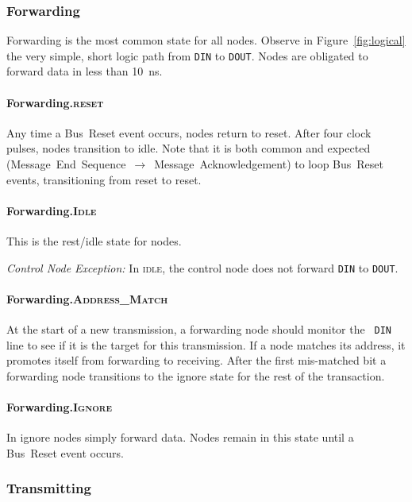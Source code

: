 \subsubsection{Forwarding}
Forwarding is the most common state for all \bus nodes.  Observe in
Figure~\ref{fig:logical} the very simple, short logic path from {\tt DIN} to
{\tt DOUT}. Nodes are obligated to forward data in less than 10~ns.

\paragraph{Forwarding.\textsc{reset}}
Any time a Bus~Reset event occurs, nodes return to {\sc reset}. After four
clock pulses, nodes transition to {\sc idle}. Note that it is both common and
expected (Message~End~Sequence~$\rightarrow$~Message~Acknowledgement) to loop
Bus~Reset events, transitioning from {\sc reset} to {\sc reset}.

\paragraph{Forwarding.\textsc{Idle}}
This is the rest/idle state for \bus nodes.

\medskip
\noindent
{\em Control Node Exception:} In \textsc{idle}, the control node does not
forward {\tt DIN} to {\tt DOUT}.

\paragraph{Forwarding.\textsc{Address\_Match}}
At the start of a new transmission, a forwarding node should monitor the {\tt
DIN} line to see if it is the target for this transmission. If a node matches
its address, it promotes itself from forwarding to receiving. After the first
mis-matched bit a forwarding node transitions to the {\sc ignore} state for
the rest of the transaction.

\paragraph{Forwarding.\textsc{Ignore}}
In {\sc ignore} nodes simply forward data. Nodes remain in this state until a
Bus~Reset event occurs.

\subsubsection{Transmitting}

